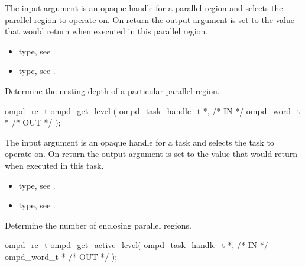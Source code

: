 \descr

\argdesc
The input argument  is an opaque handle for a parallel region and selects the parallel region to operate on.
On return the output argument  is set to the value that  would return when
executed in this parallel region.

\crossreferences
\begin{itemize}
	\item {} type, see .
	\item {} type, see .
\end{itemize}


\summary
Determine the nesting depth of a particular parallel region.

\format
\cspecificstart
\begin{boxedcode}
ompd\_rc\_t ompd\_get\_level (
  ompd\_task\_handle\_t *,                                 /* IN */
  ompd\_word\_t *                                         /* OUT */
); 
\end{boxedcode}
\cspecificend

\descr

\argdesc
The input argument  is an opaque handle for a task and selects the task to operate on.
On return the output argument  is set to the value that  would return when
executed in this task.


\crossreferences
\begin{itemize}
	\item {} type, see .
	\item {} type, see .
\end{itemize}


\summary
Determine the number of enclosing  parallel regions.

\format
\cspecificstart
\begin{boxedcode}
ompd\_rc\_t ompd\_get\_active\_level(
  ompd\_task\_handle\_t *,                                 /* IN */
  ompd\_word\_t *                                         /* OUT */
); 
\end{boxedcode}
\cspecificend

